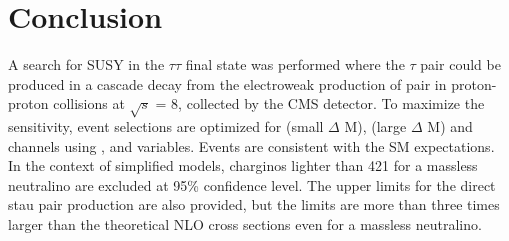 \section{Conclusion}
\label{sect:conclusion}
A search for SUSY in the $\tau\tau$ final state was performed where the
$\tau$ pair could be produced in a cascade decay from the electroweak production of \PSGcpDo pair
in proton-proton collisions at $\sqrt{s}$ = 8\TeV, collected by the CMS detector.
To maximize the sensitivity, event selections are optimized for \tauTau (small $\Delta$ M), 
\tauTau (large $\Delta$ M) and \leptonTau channels using \mttwo, \tauMT and \SumMT variables.
Events are consistent with the SM expectations. 
In the context of simplified models, charginos lighter than 421\GeV 
for a massless neutralino  are excluded at 95\% confidence level.
The upper limits for the direct stau pair production are also provided, but the limits are more than three times
larger than the theoretical NLO cross sections 
even for a massless neutralino.


